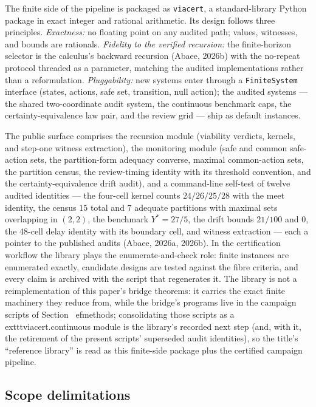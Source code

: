 \documentclass[10pt,twocolumn]{article}
\theoremstyle{plain}
\theoremstyle{definition}
\theoremstyle{remark}
\begin{document}
The finite side of the pipeline is packaged as \texttt{viacert}, a
standard-library Python package in exact integer and rational arithmetic.
Its design follows three principles. \emph{Exactness:} no floating point on
any audited path; values, witnesses, and bounds are rationals.
\emph{Fidelity to the verified recursion:} the finite-horizon selector is the
calculus's backward recursion (Abaee, 2026b) with the no-repeat protocol
threaded as a parameter, matching the audited implementations rather than a
reformulation. \emph{Pluggability:} new systems enter through a
\texttt{FiniteSystem} interface (states, actions, safe set, transition, null
action); the audited systems --- the shared two-coordinate audit system, the
continuous benchmark caps, the certainty-equivalence law pair, and the
review grid --- ship as default instances.

The public surface comprises the recursion module (viability verdicts,
kernels, and step-one witness extraction), the monitoring module (safe and
common safe-action sets, the partition-form adequacy converse, maximal
common-action sets, the partition census, the review-timing identity with
its threshold convention, and the certainty-equivalence drift audit), and a
command-line self-test of twelve audited identities --- the four-cell kernel
counts \(24/26/25/28\) with the meet identity, the census \(15\) total and
\(7\) adequate partitions with maximal sets overlapping in \((2,2)\), the
benchmark \(Y^{*} = 27/5\), the drift bounds \(21/100\) and \(0\), the
48-cell delay identity with its boundary cell, and witness extraction ---
each a pointer to the published audits (Abaee, 2026a, 2026b). In the
certification workflow the library plays the enumerate-and-check role:
finite instances are enumerated exactly, candidate designs are tested
against the fibre criteria, and every claim is archived with the script that
regenerates it. The library is not a reimplementation of this paper's bridge theorems: it carries the exact finite machinery they reduce from, while the bridge's programs live in the campaign scripts of Section~
ef{methods}; consolidating those scripts as a 	exttt{viacert.continuous} module is the library's recorded next step (and, with it, the retirement of the present scripts' superseded audit identities), so the title's ``reference library'' is read as this finite-side package plus the certified campaign pipeline.

\subsection{Scope delimitations}\label{scope}
\end{document}
